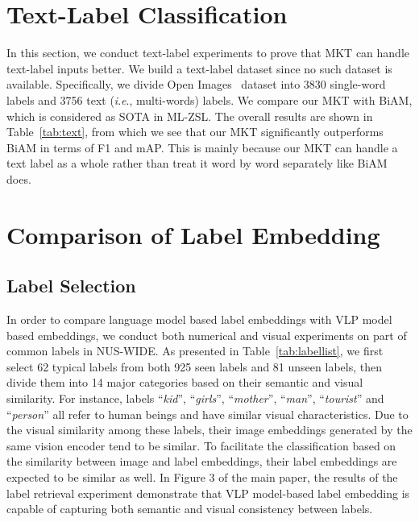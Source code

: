 \documentclass[letterpaper]{article} %
\newcommand{\ie}{\textit{i}.\textit{e}.}
\begin{document}





\section{Text-Label Classification} 
In this section, we conduct text-label experiments to prove that MKT can handle text-label inputs better. 
We build a text-label dataset since no such dataset is available.
Specifically, we divide Open Images~\cite{openiamge} dataset into 3830 single-word labels and 3756 text (\ie, multi-words) labels. 
We compare our MKT with BiAM, which is considered as SOTA in ML-ZSL.  
The overall results are shown in Table~\ref{tab:text}, from which we see that our MKT significantly outperforms BiAM in terms of F1 and mAP. 
This is mainly because our MKT can handle a text label as a whole rather than treat it word by word separately like BiAM does.


\section{Comparison of Label Embedding}
\subsection{Label Selection}
In order to compare language model based label embeddings with VLP model based embeddings, we conduct both numerical and visual experiments on part of common labels in NUS-WIDE. 
As presented in Table~\ref{tab:labellist}, we first select 62 typical labels from both 925 seen labels and 81 unseen labels, then divide them into 14 major categories based on their semantic and visual similarity.
For instance, labels ``\textit{kid}'', ``\textit{girls}'', ``\textit{mother}'', ``\textit{man}'', ``\textit{tourist}'' and ``\textit{person}'' all refer to human beings and have similar visual characteristics. 
Due to the visual similarity among these labels, their image embeddings generated by the same vision encoder tend to be similar.
To facilitate the classification based on the similarity between image and label embeddings, their label embeddings are expected to be similar as well.
In Figure 3 of the main paper, the results of the label retrieval experiment demonstrate that VLP model-based label embedding is capable of capturing both semantic and visual consistency between labels. 
\end{document}
